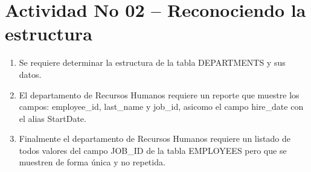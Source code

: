 \section{Actividad No 02 – Reconociendo la estructura} 

\begin{enumerate}[1.]
	\item Se requiere determinar la estructura de la tabla DEPARTMENTS y sus datos.
	\\

	\item El departamento de Recursos Humanos requiere un reporte que muestre los campos: employee\_id, last\_name y job\_id, asicomo el campo hire\_date con el alias StartDate.
	\\

	\item Finalmente el departamento de Recursos Humanos requiere un listado de todos valores del campo JOB\_ID de la tabla EMPLOYEES pero que se muestren de forma única y no repetida.
	\\

\end{enumerate}


